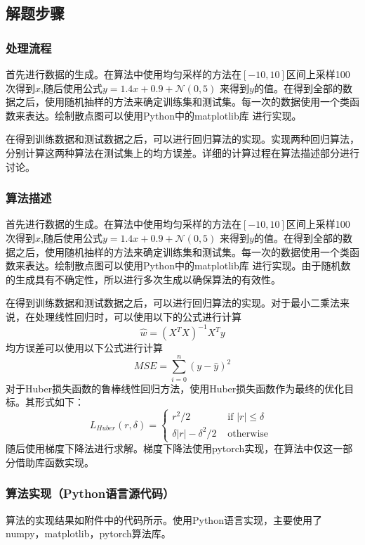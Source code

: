 \documentclass[final]{cvpr}
\begin{document}
\subsection{解题步骤}
\subsubsection{处理流程}
首先进行数据的生成。在算法中使用均匀采样的方法在$[-10,10]$区间上采样100次得到$x$,随后使用公式$y = 1.4x+0.9 + \mathcal{N}(0,5)$
来得到$y$的值。在得到全部的数据之后，使用随机抽样的方法来确定训练集和测试集。每一次的数据使用一个类函数来表达。绘制散点图可以使用Python中的matplotlib库
进行实现。\par
在得到训练数据和测试数据之后，可以进行回归算法的实现。实现两种回归算法，分别计算这两种算法在测试集上的均方误差。详细的计算过程在算法描述部分进行讨论。
\subsubsection{算法描述}
首先进行数据的生成。在算法中使用均匀采样的方法在$[-10,10]$区间上采样100次得到$x$,随后使用公式$y = 1.4x+0.9 + \mathcal{N}(0,5)$
来得到$y$的值。在得到全部的数据之后，使用随机抽样的方法来确定训练集和测试集。每一次的数据使用一个类函数来表达。绘制散点图可以使用Python中的matplotlib库
进行实现。由于随机数的生成具有不确定性，所以进行多次生成以确保算法的有效性。\par
在得到训练数据和测试数据之后，可以进行回归算法的实现。对于最小二乘法来说，在处理线性回归时，可以使用以下的公式进行计算
\begin{equation}
    \hat{w} = (X^TX)^{-1}X^Ty
\end{equation}
均方误差可以使用以下公式进行计算
\begin{equation}
    MSE = \sum_{i=0}^{n}{(y-\hat{y})^2}
\end{equation}
对于Huber损失函数的鲁棒线性回归方法，使用Huber损失函数作为最终的优化目标。其形式如下：
\begin{equation}
    L_{H u b e r}(r, \delta)=\left\{\begin{array}{cl}
        r^{2} / 2 & \text { if }|r| \leq \delta \\
        \delta|r|-\delta^{2} / 2 & \text { otherwise }
        \end{array}\right.
\end{equation}
随后使用梯度下降法进行求解。梯度下降法使用pytorch实现，在算法中仅这一部分借助库函数实现。
\subsubsection{算法实现（Python语言源代码）}
算法的实现结果如附件中的代码所示。使用Python语言实现，主要使用了numpy，matplotlib，pytorch算法库。
\end{document}
